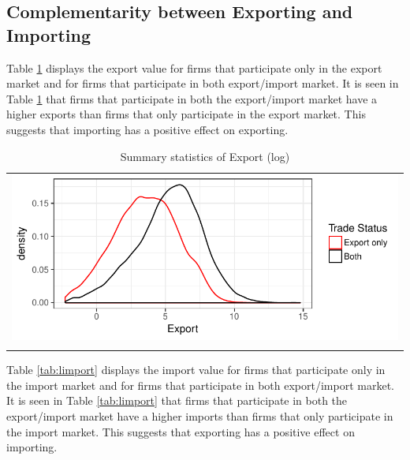 \documentclass[11pt]{article}
\begin{document}
\subsection{Complementarity between Exporting and Importing}
Table \ref{tab:lexport} displays the export value for firms that participate only in the
export market and for firms that participate in both export/import
market. 
It is seen in Table \ref{tab:lexport} that firms that participate in both the
export/import market have a higher exports than firms that only
participate in the export market. This suggests that importing has a
positive effect on exporting.   
\begin{center}
\begin{table}[htp]
\caption{Summary statistics of Export (log)}
\label{tab:lexport}
\begin{tabular}{c}
 \includegraphics{./PICS/denslexport.pdf}   \\ 
   \\  
\end{tabular}
\end{table}
\end{center}
Table \ref{tab:limport} displays the import value for firms that participate only in the
import market and for firms that participate in both export/import
market. 
It is seen in Table \ref{tab:limport} that firms that participate in both the
export/import market have a higher imports than firms that only
participate in the import market. This suggests that exporting has a
positive effect on importing.  
\end{document}

